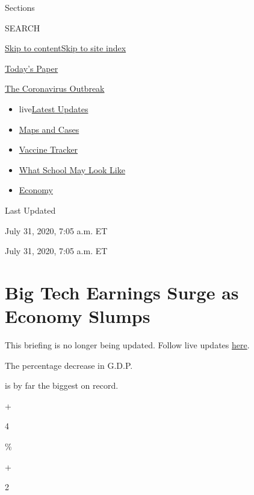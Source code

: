 Sections

SEARCH

\protect\hyperlink{site-content}{Skip to
content}\protect\hyperlink{site-index}{Skip to site index}

\href{https://myaccount.nytimes.com/auth/login?response_type=cookie\&client_id=vi}{}

\href{https://www.nytimes.com/section/todayspaper}{Today's Paper}

\href{https://www.nytimes.com/news-event/coronavirus}{The Coronavirus
Outbreak}

\begin{itemize}
\tightlist
\item
  live\href{https://www.nytimes.com/2020/08/01/world/coronavirus-covid-19.html}{Latest
  Updates}
\item
  \href{https://www.nytimes.com/interactive/2020/us/coronavirus-us-cases.html}{Maps
  and Cases}
\item
  \href{https://www.nytimes.com/interactive/2020/science/coronavirus-vaccine-tracker.html}{Vaccine
  Tracker}
\item
  \href{https://www.nytimes.com/interactive/2020/07/29/us/schools-reopening-coronavirus.html}{What
  School May Look Like}
\item
  \href{https://www.nytimes.com/live/2020/07/31/business/stock-market-today-coronavirus}{Economy}
\end{itemize}

Last Updated

July 31, 2020, 7:05 a.m. ET

July 31, 2020, 7:05 a.m. ET

\hypertarget{big-tech-earnings-surge-as-economy-slumps}{%
\section{Big Tech Earnings Surge as Economy
Slumps}\label{big-tech-earnings-surge-as-economy-slumps}}

This briefing is no longer being updated. Follow live updates
\href{https://www.nytimes.com/live/2020/07/31/business/stock-market-today-coronavirus}{here}.

The percentage decrease in G.D.P.

is by far the biggest on record.

+

4

\%

+

2

